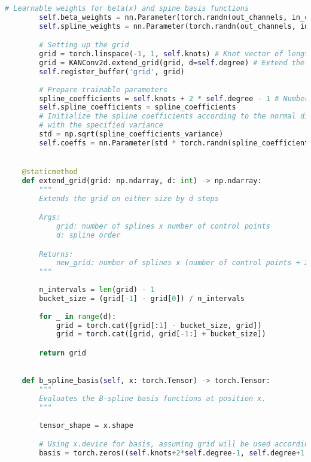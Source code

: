 \begin{lstlisting}[language=Python]
        # Learnable weights for beta(x) and spine basis functions
        self.beta_weights = nn.Parameter(torch.randn(out_channels, in_channels, kernel_size[0], kernel_size[1]))
        self.spline_weights = nn.Parameter(torch.randn(out_channels, in_channels, kernel_size[0], kernel_size[1]))

        # Setting up the grid
        grid = torch.linspace(-1, 1, self.knots) # Knot vector of length knots + degree + 1
        grid = KANConv2d.extend_grid(grid, d=self.degree) # Extend the grid on either side by degree steps
        self.register_buffer('grid', grid)
        
        # Prepare trainable parameters
        spline_coefficients = self.knots + 2 * self.degree - 1 # Number of coefficients for the spline representation
        self.spline_coefficients = spline_coefficients
        # Initialize the spline coefficients according to the normal distribution
        # with the specified variance
        std = np.sqrt(spline_coefficients_variance)
        self.coeffs = nn.Parameter(std * torch.randn(spline_coefficients, out_channels, in_channels, kernel_size[0], kernel_size[1])) # Learnable coefficients


    @staticmethod
    def extend_grid(grid: np.ndarray, d: int) -> np.ndarray:
        """
        Extends the grid on either size by d steps

        Args:
            grid: number of splines x number of control points
            d: spline order

        Returns:
            new_grid: number of splines x (number of control points + 2*d)
        """
        
        n_intervals = len(grid) - 1
        bucket_size = (grid[-1] - grid[0]) / n_intervals
        
        for _ in range(d):
            grid = torch.cat([grid[:1] - bucket_size, grid])
            grid = torch.cat([grid, grid[-1:] + bucket_size])

        return grid

    
    def b_spline_basis(self, x: torch.Tensor) -> torch.Tensor:
        """
        Evaluates the B-spline basis functions at position x.
        """
        
        tensor_shape = x.shape

        # Using x.device for basis, assuming grid will be used accordingly or is on the same device
        basis = torch.zeros((self.knots+2*self.degree-1, self.degree+1, *tensor_shape), dtype=x.dtype, device=x.device)
        

\end{lstlisting}
